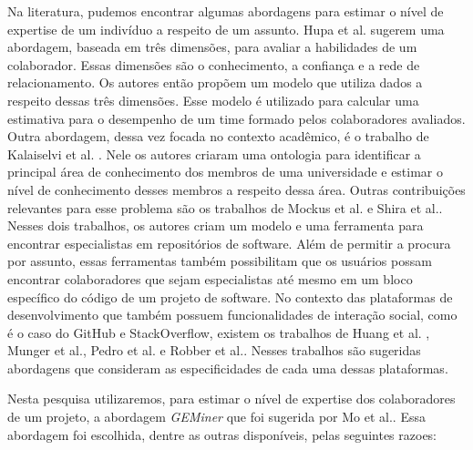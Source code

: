 Na literatura, pudemos encontrar algumas abordagens para estimar o nível de expertise de um indivíduo a respeito de um assunto.   Hupa et al.\cite{hupa2010interdisciplinary} sugerem uma abordagem,  baseada em três dimensões, para avaliar a  habilidades de um colaborador. Essas dimensões são o conhecimento, a confiança e a rede de relacionamento. Os autores então propõem um modelo que utiliza dados a respeito dessas três dimensões. Esse modelo é utilizado para calcular uma estimativa para o desempenho de um time formado pelos colaboradores avaliados. Outra abordagem, dessa vez focada no contexto acadêmico, é o trabalho de Kalaiselvi et al. \cite{kalaiselvi2013ontological}. Nele os autores criaram uma ontologia para identificar a principal área de conhecimento dos membros de uma universidade e estimar o nível de conhecimento desses membros a respeito dessa área.  Outras contribuições relevantes para esse problema são os trabalhos de Mockus et al.\cite{mockus2002expertise} e Shira et al.\cite{shira2011expert}. Nesses dois trabalhos, os autores criam um modelo  e uma ferramenta para encontrar especialistas em repositórios de software. Além de permitir a procura por assunto, essas ferramentas também possibilitam que os usuários possam encontrar colaboradores que sejam especialistas até mesmo em um bloco específico do código de um projeto de software. No contexto das plataformas de desenvolvimento que também possuem funcionalidades de interação social, como é o caso do GitHub e StackOverflow, existem os trabalhos de Huang et al. \cite{huang2017expert}, Munger et al.\cite{munger2014automatically}, Pedro et al.\cite{san2013multiple} e Robber et al.\cite{robbes2013using}. Nesses trabalhos são sugeridas  abordagens que consideram as especificidades  de cada uma dessas plataformas.

Nesta pesquisa utilizaremos,  para estimar o nível de expertise dos colaboradores de um projeto,  a abordagem \textit{GEMiner} que foi sugerida por Mo et al.\cite{mo2015geminer}.  Essa abordagem foi escolhida, dentre as outras disponíveis, pelas seguintes razoes:

